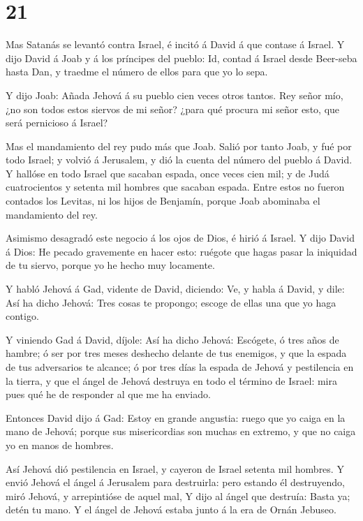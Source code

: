 \hypertarget{section-20}{%
\section{21}\label{section-20}}

 Mas Satanás se levantó contra Israel, é incitó á David á
que contase á Israel.  Y dijo David á Joab y á los príncipes
del pueblo: Id, contad á Israel desde Beer-seba hasta Dan, y traedme el
número de ellos para que yo lo sepa.

 Y dijo Joab: Añada Jehová á su pueblo cien veces otros
tantos. Rey señor mío, ¿no son todos estos siervos de mi señor? ¿para
qué procura mi señor esto, que será pernicioso á Israel?

 Mas el mandamiento del rey pudo más que Joab. Salió por
tanto Joab, y fué por todo Israel; y volvió á Jerusalem, y dió la cuenta
del número del pueblo á David.  Y hallóse en todo Israel que
sacaban espada, once veces cien mil; y de Judá cuatrocientos y setenta
mil hombres que sacaban espada.  Entre estos no fueron
contados los Levitas, ni los hijos de Benjamín, porque Joab abominaba el
mandamiento del rey.

 Asimismo desagradó este negocio á los ojos de Dios, é hirió
á Israel.  Y dijo David á Dios: He pecado gravemente en
hacer esto: ruégote que hagas pasar la iniquidad de tu siervo, porque yo
he hecho muy locamente.

 Y habló Jehová á Gad, vidente de David, diciendo:
 Ve, y habla á David, y dile: Así ha dicho Jehová: Tres
cosas te propongo; escoge de ellas una que yo haga contigo.

 Y viniendo Gad á David, díjole: Así ha dicho Jehová:
 Escógete, ó tres años de hambre; ó ser por tres meses
deshecho delante de tus enemigos, y que la espada de tus adversarios te
alcance; ó por tres días la espada de Jehová y pestilencia en la tierra,
y que el ángel de Jehová destruya en todo el término de Israel: mira
pues qué he de responder al que me ha enviado.

 Entonces David dijo á Gad: Estoy en grande angustia: ruego
que yo caiga en la mano de Jehová; porque sus misericordias son muchas
en extremo, y que no caiga yo en manos de hombres.

 Así Jehová dió pestilencia en Israel, y cayeron de Israel
setenta mil hombres.  Y envió Jehová el ángel á Jerusalem
para destruirla: pero estando él destruyendo, miró Jehová, y
arrepintióse de aquel mal,  Y dijo al ángel que destruía:
Basta ya; detén tu mano. Y el ángel de Jehová estaba junto á la era de
Ornán Jebuseo.

